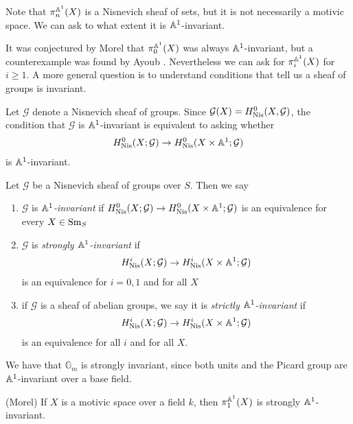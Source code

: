 \documentclass[11pt,openany]{book}
\begin{document}
Note that $\pi_n^{\mathbb{A}^1}(X)$ is a Nisnevich sheaf of sets, but it is not necessarily a motivic space. We can ask to what extent it is $\mathbb{A}^1$-invariant.

It was conjectured by Morel that $\pi_0^{\mathbb{A}^1}(X)$ was always $\mathbb{A}^1$-invariant, but a counterexample was found by Ayoub \cite{Ayoub-counterexamples}. Nevertheless we can ask for $\pi_i^{\mathbb{A}^1}(X)$ for $i\ge 1$. A more general question is to understand conditions that tell us a sheaf of groups is invariant.

Let $\mathcal{G}$ denote a Nisnevich sheaf of groups. Since $\mathcal{G}(X) = H^0_{\mathrm{Nis}}(X,\mathcal{G})$, the condition that $\mathcal{G}$ is $\mathbb{A}^1$-invariant is equivalent to asking whether
\begin{align*}
    H^0_{\mathrm{Nis}}(X; \mathcal{G}) \to H^0_{\mathrm{Nis}}(X \times \mathbb{A}^1 ; \mathcal{G})
\end{align*}
is $\mathbb{A}^1$-invariant.


\begin{definition} Let $\mathcal{G}$ be a Nisnevich sheaf of groups over $S$. Then we say
\begin{enumerate}
    \item $\mathcal{G}$ is $\mathbb{A}^1$\textit{-invariant} if $H^0_{\mathrm{Nis}}(X; \mathcal{G}) \to H^0_{\mathrm{Nis}}(X \times \mathbb{A}^1 ; \mathcal{G})$ is an equivalence for every $X\in \mathrm{Sm}_S$
    \item $\mathcal{G}$ is \textit{strongly $\mathbb{A}^1$-invariant} if
    \begin{align*}
        H^i_{\mathrm{Nis}}(X; \mathcal{G}) \to H^i_{\mathrm{Nis}}(X \times \mathbb{A}^1; \mathcal{G})
    \end{align*}
    is an equivalence for $i=0,1$ and for all $X$
    \item if $\mathcal{G}$ is a sheaf of abelian groups, we say it is \textit{strictly $\mathbb{A}^1$-invariant} if
    \begin{align*}
        H^i_{\mathrm{Nis}}(X; \mathcal{G}) \to H^i_{\mathrm{Nis}}(X \times \mathbb{A}^1; \mathcal{G})
    \end{align*}
    is an equivalence for all $i$ and for all $X$.
\end{enumerate}
\end{definition}


\begin{example} We have that $\mathbb{G}_m$ is strongly invariant, since both units and the Picard group are $\mathbb{A}^1$-invariant over a base field.
\end{example}

\begin{theorem}\label{thm:pi1-strongly-invt} 
(Morel) If $X$ is a motivic space over a field $k$, then $\pi_1^{\mathbb{A}^1}(X)$ is strongly $\mathbb{A}^1$-invariant.
\end{theorem}
\end{document}
